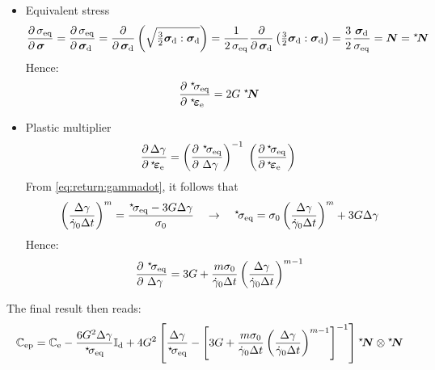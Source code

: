 \documentclass[times,namecite]{goose-article}
\newcommand\leftstar[1]{\hspace*{-.3em}~^\star\!#1}
\begin{document}
\begin{itemize}
%
\item Equivalent stress
\begin{equation}
\frac{\partial\, \sigma_\mathrm{eq} \hfill}{\partial\, \bm{\sigma} \hfill}
  = \frac{
    \partial\, \sigma_\mathrm{eq} \hfill
  }{
    \partial\, \bm{\sigma}_\mathrm{d} \hfill
  }
  = \frac{
    \partial
  }{
    \partial\, \bm{\sigma}_\mathrm{d}
  } \left(
    \sqrt{ \tfrac{3}{2} \bm{\sigma}_\mathrm{d} : \bm{\sigma}_\mathrm{d} }
  \right)
  = \frac{1}{2 \, \sigma_\mathrm{eq} }
  \frac{\partial}{\partial\, \bm{\sigma}_\mathrm{d}}
  \left(
    \tfrac{3}{2} \bm{\sigma}_\mathrm{d} : \bm{\sigma}_\mathrm{d}
  \right)
  = \frac{3}{2} \frac{\bm{\sigma}_\mathrm{d}}{\sigma_\mathrm{eq}}
  = \bm{N} = \leftstar{\bm{N}}
\end{equation}
Hence:
\begin{equation}
\frac{
    \partial \;\leftstar{\sigma}_\mathrm{eq} \hfill
  }{
    \partial \;\leftstar{\bm{\varepsilon}}_\mathrm{e} \hfill
  } =
  2 G \;\leftstar{\bm{N}}
\end{equation}
%
\item Plastic multiplier
\begin{align}
  \frac{
    \partial \,\Delta \gamma \hfill
  }{
    \partial \,\leftstar{\bm{\varepsilon}}_\mathrm{e}  \hfill
  }
  =
  \left( \frac{
    \partial ~\leftstar{\sigma}_\mathrm{eq} \hfill
  }{
    \partial ~\Delta \gamma      \hfill
  } \right)^{-1} \;
  \left( \frac{
    \partial \,\leftstar{\sigma}_\mathrm{eq} \hfill
  }{
    \partial \,\leftstar{\bm{\varepsilon}}_\mathrm{e} \hfill
  } \right) \;
\end{align}
From \eqref{eq:return:gammadot}, it follows that
\begin{equation}
\left(
    \frac{\Delta \gamma}{\dot{\gamma}_0 \Delta t}
  \right)^m
  =
  \frac{
    \leftstar{\sigma}_\mathrm{eq} - 3 G \Delta \gamma
  }{
    \sigma_0
  }
  \quad\rightarrow\quad
  \leftstar{\sigma}_\mathrm{eq}
  =
  \sigma_0 \left( \frac{\Delta \gamma}{\dot{\gamma}_0 \Delta t} \right)^m +
  3 G \Delta \gamma
\end{equation}
Hence:
\begin{equation}
\frac{
    \partial ~\leftstar{\sigma}_\mathrm{eq} \hfill
  }{
    \partial ~\Delta \gamma      \hfill
  }
  =
  3 G + \frac{m \sigma_0}{\dot{\gamma}_0 \Delta t}
  \left(
    \frac{\Delta \gamma}{\dot{\gamma}_0 \Delta t}
  \right)^{m-1}
\end{equation}
%
\end{itemize}
%
The final result then reads:
\begin{equation}
\mathbb{C}_\mathrm{ep}
=
\mathbb{C}_\mathrm{e} -
\frac{6 G^2 \Delta \gamma}{\leftstar{\sigma}_\mathrm{eq}} \mathbb{I}_\mathrm{d}
+ 4 G^2
\left[
  \frac{\Delta \gamma}{\leftstar{\sigma}_\mathrm{eq}} -
  \left[
    3G + \frac{m \sigma_0}{\dot{\gamma}_0 \Delta t}
    \left(
      \frac{\Delta \gamma}{\dot{\gamma}_0 \Delta t}
    \right)^{m-1}
  \right]^{-1}
\right]
\leftstar{\bm{N}} \otimes \leftstar{\bm{N}}
\end{equation}
\end{document}
